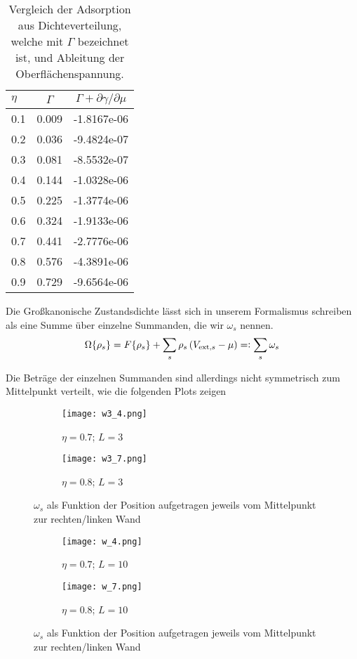 \documentclass[12pt]{article}
\begin{document}
\begin{table}[H]\centering\begin{tabular}{l | c | c }
$\eta$&$\Gamma$&$\Gamma+\partial\gamma/\partial\mu$\\\hline\hline
0.1&0.009&-1.8167e-06\\
0.2&0.036&-9.4824e-07\\
0.3&0.081&-8.5532e-07\\
0.4&0.144&-1.0328e-06\\
0.5&0.225&-1.3774e-06\\
0.6&0.324&-1.9133e-06\\
0.7&0.441&-2.7776e-06\\
0.8&0.576&-4.3891e-06\\
0.9&0.729&-9.6564e-06
\end{tabular}\caption{Vergleich der Adsorption aus Dichteverteilung, welche mit $\Gamma$ bezeichnet ist, und Ableitung der Oberflächenspannung.}\end{table}

Die Großkanonische Zustandsdichte lässt sich in unserem Formalismus schreiben als eine Summe über einzelne Summanden, die wir $\omega_s$ nennen.
\begin{equation*}\Omega\{\rho_s\}=F\{\rho_s\}+\sum_s\rho_s\,(V_{\text{ext},s}-\mu)=\vcentcolon\sum_s\omega_s\end{equation*}

Die Beträge der einzelnen Summanden sind allerdings nicht symmetrisch zum Mittelpunkt verteilt, wie die folgenden  Plots zeigen


\begin{figure}[H]\hspace*{-1.5cm}
\begin{subfigure}{0.4\textwidth}
\texttt{[image: w3\_4.png]}
\caption{$\eta=0.7$; $L=3$}
\end{subfigure}
\hfill
\begin{subfigure}{0.4\textwidth}
\hspace*{-0.8cm}
\texttt{[image: w3\_7.png]}
\caption{$\eta=0.8$; $L=3$}
\end{subfigure}
\hfill
\caption{$\omega_s$ als Funktion der Position aufgetragen jeweils vom Mittelpunkt zur rechten/linken Wand}
\end{figure}


\begin{figure}[H]\hspace*{-1.5cm}
\begin{subfigure}{0.4\textwidth}
\texttt{[image: w\_4.png]}
\caption{$\eta=0.7$; $L=10$}
\end{subfigure}
\hfill
\begin{subfigure}{0.4\textwidth}
\hspace*{-0.8cm}
\texttt{[image: w\_7.png]}
\caption{$\eta=0.8$; $L=10$}
\end{subfigure}
\hfill
\caption{$\omega_s$ als Funktion der Position aufgetragen jeweils vom Mittelpunkt zur rechten/linken Wand}
\end{figure}
\end{document}

